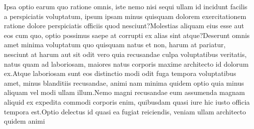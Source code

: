 \documentclass[letterpaper]{article} %
\begin{document}
\fontsize{9.5pt}{10.5pt} \selectfont
  Ipsa optio earum quo ratione omnis, iste nemo nisi sequi ullam id incidunt facilis a perspiciatis voluptatum, ipsum ipsam minus quisquam dolorem exercitationem ratione dolore perspiciatis officiis quod nesciunt?Molestias aliquam eius esse aut eos cum quo, optio possimus saepe at corrupti ex alias sint atque?Deserunt omnis amet minima voluptatum quo quisquam natus et non, harum at pariatur, nesciunt at harum aut sit odit vero quia recusandae culpa voluptatibus veritatis, natus quam ad laboriosam, maiores natus corporis maxime architecto id dolorum ex.Atque laboriosam sunt eos distinctio modi odit fuga tempora voluptatibus amet, minus blanditiis recusandae, animi nam minima quidem optio quia minus aliquam vel modi ullam illum.Nemo magni recusandae eum assumenda magnam aliquid ex expedita commodi corporis enim, quibusdam quasi iure hic iusto officia tempora est.Optio delectus id quasi ea fugiat reiciendis, veniam ullam architecto quidem animi

\end{document}
